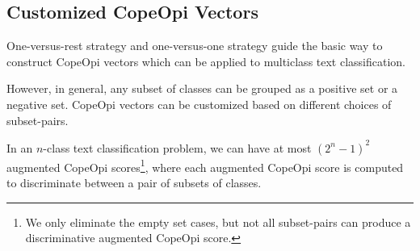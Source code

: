 \clearpage
\subsection{Customized CopeOpi Vectors}\label{sec:customized}
\par One-versus-rest strategy and one-versus-one strategy guide the basic way to construct CopeOpi vectors which can be applied to multiclass text classification.
\par However, in general, any subset of classes can be grouped as a positive set or a negative set. CopeOpi vectors can be customized based on different choices of subset-pairs.
~\newline
~\newline
{}
\par In an $n$-class text classification problem, we can have at most $(2^n-1)^2$ augmented CopeOpi scores\footnote{We only eliminate the empty set cases, but not all subset-pairs can produce a discriminative augmented CopeOpi score.},
where each augmented CopeOpi score is computed to discriminate between a pair of subsets of classes.
